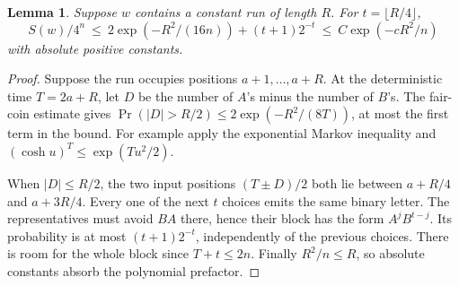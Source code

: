 \documentclass[11pt,letterpaper]{article}
\newtheorem{lemma}[theorem]{Lemma}
\begin{document}
\begin{lemma}\label{long}
Suppose \(w\) contains a constant run of length \(R\). For \(t=\lfloor R/4\rfloor\),
\[
 S(w)/4^n\ \le\ 2\exp(-R^2/(16n))+(t+1)2^{-t}
 \ \le\ C\exp(-cR^2/n)
\]
with absolute positive constants.
\end{lemma}
\begin{proof}
Suppose the run occupies positions \(a+1,\ldots,a+R\). At the deterministic time \(T=2a+R\), let \(D\) be the number of \(A\)'s minus the number of \(B\)'s. The fair-coin estimate gives \(\Pr(|D|>R/2)\le 2\exp(-R^2/(8T))\), at most the first term in the bound. For example apply the exponential Markov inequality and \((\cosh u)^T\le\exp(Tu^2/2)\).

When \(|D|\le R/2\), the two input positions \((T\pm D)/2\) both lie between \(a+R/4\) and \(a+3R/4\). Every one of the next \(t\) choices emits the same binary letter. The representatives must avoid \(BA\) there, hence their block has the form \(A^jB^{t-j}\). Its probability is at most \((t+1)2^{-t}\), independently of the previous choices. There is room for the whole block since \(T+t\le2n\). Finally \(R^2/n\le R\), so absolute constants absorb the polynomial prefactor.
\end{proof}
\end{document}
